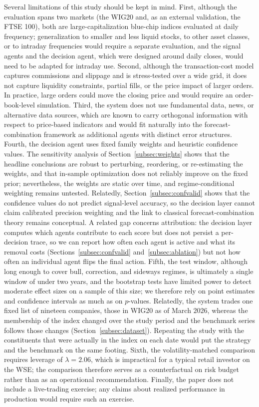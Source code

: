 \documentclass{ieeeaccess}
\newcommand{\Leverage}{\ensuremath{2.06}}
\begin{document}
Several limitations of this study should be kept in mind. First, although the evaluation spans two markets (the WIG20 and, as an external validation, the FTSE 100), both are large-capitalization blue-chip indices evaluated at daily frequency; generalization to smaller and less liquid stocks, to other asset classes, or to intraday frequencies would require a separate evaluation, and the signal agents and the decision agent, which were designed around daily closes, would need to be adapted for intraday use. Second, although the transaction-cost model captures commissions and slippage and is stress-tested over a wide grid, it does not capture liquidity constraints, partial fills, or the price impact of larger orders. In practice, large orders could move the closing price and would require an order-book-level simulation. Third, the system does not use fundamental data, news, or alternative data sources, which are known to carry orthogonal information with respect to price-based indicators and would fit naturally into the forecast-combination framework as additional agents with distinct error structures. Fourth, the decision agent uses fixed family weights and heuristic confidence values. The sensitivity analysis of Section~\ref{subsec:weights} shows that the headline conclusions are robust to perturbing, reordering, or re-estimating the weights, and that in-sample optimization does not reliably improve on the fixed prior; nevertheless, the weights are static over time, and regime-conditional weighting remains untested. Relatedly, Section~\ref{subsec:confvalid} shows that the confidence values do not predict signal-level accuracy, so the decision layer cannot claim calibrated precision weighting and the link to classical forecast-combination theory remains conceptual. A related gap concerns attribution: the decision layer computes which agents contribute to each score but does not persist a per-decision trace, so we can report how often each agent is active and what its removal costs (Sections~\ref{subsec:confvalid} and~\ref{subsec:ablation}) but not how often an individual agent flips the final action. Fifth, the test window, although long enough to cover bull, correction, and sideways regimes, is ultimately a single window of under two years, and the bootstrap tests have limited power to detect moderate effect sizes on a sample of this size; we therefore rely on point estimates and confidence intervals as much as on $p$-values. Relatedly, the system trades one fixed list of nineteen companies, those in WIG20 as of March $2026$, whereas the membership of the index changed over the study period and the benchmark series follows those changes (Section~\ref{subsec:dataset}). Repeating the study with the constituents that were actually in the index on each date would put the strategy and the benchmark on the same footing. Sixth, the volatility-matched comparison requires leverage of $\lambda = \Leverage{}$, which is impractical for a typical retail investor on the WSE; the comparison therefore serves as a counterfactual on risk budget rather than as an operational recommendation. Finally, the paper does not include a live-trading exercise; any claims about realized performance in production would require such an exercise.
\end{document}
